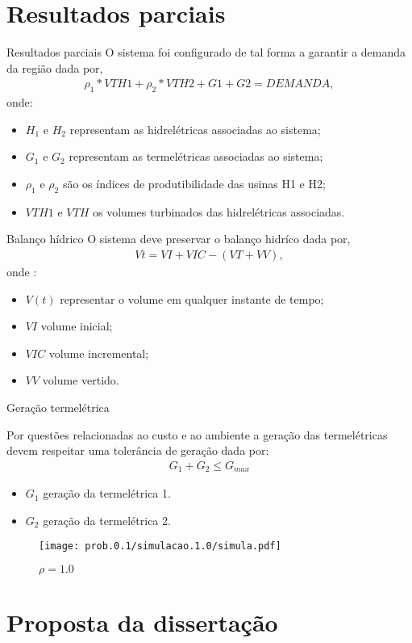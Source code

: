 \documentclass[12pt]{beamer}
\begin{document}
\section{Resultados parciais}
\begin{frame}{Resultados parciais}
O sistema foi configurado de tal forma a garantir a demanda da regi\~ao dada por,
\begin{align*}
{\rho}_1*VTH1 + {\rho}_2*VTH2 + G1 + G2 = DEMANDA,
\end{align*}
onde:
\begin{itemize}
	\item $H_1$ e $H_2$ representam as hidrel\'etricas associadas ao sistema;
	\item $G_1$ e $G_2$ representam as termel\'etricas associadas ao sistema;
	\item $\rho_1$ e $\rho_2$ s\~ao os \'indices de produtibilidade das usinas H1 e H2;
	\item $VTH1$ e $VTH$  os volumes turbinados das hidrel\'etricas associadas.
\end{itemize}
\end{frame}
\begin{frame}{Balan\c co h\'idrico}
O sistema deve preservar o balan\c co hidr\'ico dada por,
{\setlength{\belowdisplayskip}{-4pt}
\begin{align*}
  \displaystyle Vt = VI + VIC - \left( VT + VV \right), 
\end{align*}}
onde : 
\begin{itemize}
	\item $V(t)$ representar o volume em qualquer instante de tempo;
	\item $VI$  volume inicial;
	\item $VIC$ volume incremental;
	\item $VV$ volume vertido.
\end{itemize}
\end{frame}
\begin{frame}{Gera\c c\~ao termel\'etrica}
\begin{justify}	
Por quest\~oes relacionadas ao custo e ao ambiente a gera\c c\~ao das termel\'etricas devem respeitar uma toler\^ancia de
gera\c c\~ao dada por:
\begin{align*}
	G_1 + G_2 \leq G_{max}
\end{align*}
\begin{itemize}
	\item $G_1$ gera\c c\~ao da termel\'etrica 1.
	\item $G_2$ gera\c c\~ao da termel\'etrica 2.
\end{itemize}
\end{justify}	
\end{frame}

\begin{frame}
\begin{figure}[!ht]
	\centering
		\texttt{[image: prob.0.1/simulacao.1.0/simula.pdf]}
	\begin{center}	
		$\rho = 1.0$
	\end{center}
\end{figure}
\end{frame}

\section{Proposta da disserta\c c\~ao}

\begin{frame}
\end{frame}
\end{document}
